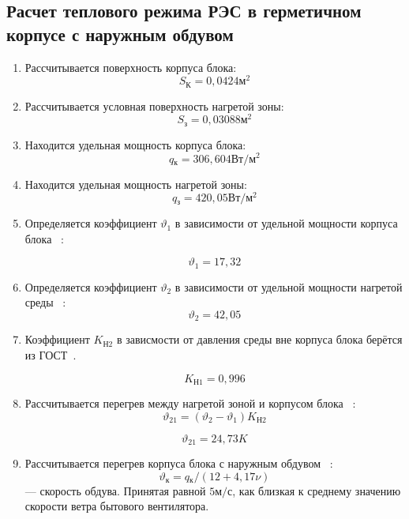 \subsection{Расчет теплового режима РЭС в герметичном корпусе с наружным обдувом}

\begin{enumerate}[label={\arabic*.}]
\item Рассчитывается поверхность корпуса блока: %
  $$S\mathrm{_{К}}=0,0424\mathrm{м^2}$$

\item Рассчитывается условная поверхность нагретой зоны: %
  $$S\mathrm{_{з}} = 0,03088\mathrm{м^2}$$ 
\item Находится удельная мощность корпуса блока:  %
  $$q\mathrm{_к} = 306,604\mathrm{Вт/м^2}$$

\item Находится удельная мощность нагретой зоны: %
  $$q\mathrm{_з} = 420,05 \mathrm{ Вт/м^2}$$

\item Определяется коэффициент $\vartheta_1$ в зависимости от удельной мощности корпуса блока ~\cite{Rotkop1976}:

  $$\vartheta_1=17,32$$
\item Определяется коэффициент $\vartheta_2$ в зависимости от удельной мощности нагретой среды ~\cite{Rotkop1976}:
  $$\vartheta_2=42,05$$
  

\item Коэффициент $K\mathrm{_{Н2}}$ в зависмости от давления
  среды вне корпуса блока берётся из ГОСТ~\cite{GOST-15150-69}.

  $$K\mathrm{_{Н1}} = 0,996$$

\item Рассчитывается перегрев между нагретой зоной и корпусом блока
  ~\cite{Rotkop1976}:
  \begin{equation}
    \vartheta_{21} = (\vartheta_{2}-\vartheta_{1})K\mathrm{_{Н2}}
    \end{equation}

    $$\vartheta_{21}=24,73 K$$

\item Рассчитывается перегрев корпуса блока с наружным обдувом
    ~\cite{Rotkop1976}:
    \begin{equation}
      \vartheta\mathrm{_к} = q\mathrm{_к}/(12 + 4,17 \nu)
      \end{equation}
      \nu — скорость обдува. Принятая равной $5\mathrm{м/с}$,
      как близкая к среднему значению скорости ветра бытового
вентилятора.


\end{enumerate}
